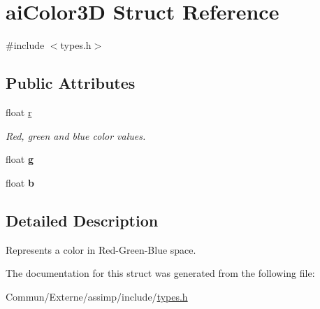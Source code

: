 \hypertarget{structai_color3_d}{}\section{ai\+Color3D Struct Reference}
\label{structai_color3_d}


{\ttfamily \#include $<$types.\+h$>$}

\subsection*{Public Attributes}
\begin{DoxyCompactItemize}
\item 
float \hyperlink{structai_color3_d_a0ff704458aa26c84bbfe93b2dd89c630}{r}\hypertarget{structai_color3_d_a0ff704458aa26c84bbfe93b2dd89c630}{}\label{structai_color3_d_a0ff704458aa26c84bbfe93b2dd89c630}

\begin{DoxyCompactList}\small\item\em Red, green and blue color values. \end{DoxyCompactList}\item 
float {\bfseries g}\hypertarget{structai_color3_d_a40ecdcee92b5373cbaa5e00ebcdb2cfb}{}\label{structai_color3_d_a40ecdcee92b5373cbaa5e00ebcdb2cfb}

\item 
float {\bfseries b}\hypertarget{structai_color3_d_a02ddcc7af11f7d4d6ea14f1bfb4ef6c7}{}\label{structai_color3_d_a02ddcc7af11f7d4d6ea14f1bfb4ef6c7}

\end{DoxyCompactItemize}


\subsection{Detailed Description}
Represents a color in Red-\/\+Green-\/\+Blue space. 

The documentation for this struct was generated from the following file\+:\begin{DoxyCompactItemize}
\item 
Commun/\+Externe/assimp/include/\hyperlink{types_8h}{types.\+h}\end{DoxyCompactItemize}
